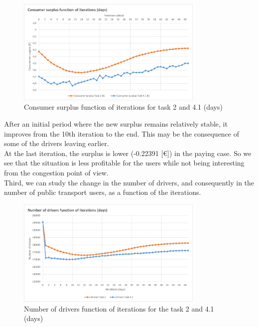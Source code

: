 \documentclass[a4paper, 12pt,oneside]{article}
\begin{document}
\begin{figure}[H]
    \centering
    \includegraphics[width=0.8\textwidth]{Images/Step4/Consumer_surplus_function_iterations_comparaison_task_2_4.1.png}
    \caption{Consumer surplus function of iterations for task 2 and 4.1 (days)}
    \label{fig:Consumer surplus function of iterations for the task 2 and 4.1 (days)}
\end{figure}

After an initial period where the new surplus remains relatively stable, it improves from the 10th iteration to the end. This may be the consequence of some of the drivers leaving earlier.\\

At the last iteration, the surplus is lower (-0.22391 [€]) in the paying case. So we see that the situation is less profitable for the users while not being interesting from the congestion point of view.\\


Third, we can study the change in the number of drivers, and consequently in the number of public transport users, as a function of the iterations.\\


\begin{figure}[H]
    \centering
    \includegraphics[width=0.8\textwidth]{Images/Step4/number_drivers_function_iterations_comparaison_task_2_4.1.png}
    \caption{Number of drivers function of iterations for the task 2 and 4.1 (days)}
    \label{fig:Number of drivers function of iterations for the task 2 and 4.1 (days)}
\end{figure}
\end{document}

